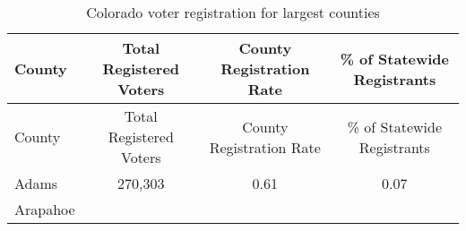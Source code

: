 \documentclass[12pt,twoside]{reedthesis}
\begin{document}
  \begin{longtable}[]{@{}lccc@{}}
  \caption{Colorado voter registration for largest counties
  \label{tab:voter_reg}}\tabularnewline
  \toprule
  \begin{minipage}[b]{0.10\columnwidth}\raggedright\strut
  County\strut
  \end{minipage} & \begin{minipage}[b]{0.24\columnwidth}\centering\strut
  Total Registered Voters\strut
  \end{minipage} & \begin{minipage}[b]{0.29\columnwidth}\centering\strut
  County Registration Rate\strut
  \end{minipage} & \begin{minipage}[b]{0.25\columnwidth}\centering\strut
  \% of Statewide Registrants\strut
  \end{minipage}\tabularnewline
  \midrule
  \endfirsthead
  \toprule
  \begin{minipage}[b]{0.10\columnwidth}\raggedright\strut
  County\strut
  \end{minipage} & \begin{minipage}[b]{0.24\columnwidth}\centering\strut
  Total Registered Voters\strut
  \end{minipage} & \begin{minipage}[b]{0.29\columnwidth}\centering\strut
  County Registration Rate\strut
  \end{minipage} & \begin{minipage}[b]{0.25\columnwidth}\centering\strut
  \% of Statewide Registrants\strut
  \end{minipage}\tabularnewline
  \midrule
  \endhead
  \begin{minipage}[t]{0.10\columnwidth}\raggedright\strut
  Adams\strut
  \end{minipage} & \begin{minipage}[t]{0.24\columnwidth}\centering\strut
  270,303\strut
  \end{minipage} & \begin{minipage}[t]{0.29\columnwidth}\centering\strut
  0.61\strut
  \end{minipage} & \begin{minipage}[t]{0.25\columnwidth}\centering\strut
  0.07\strut
  \end{minipage}\tabularnewline
  \begin{minipage}[t]{0.10\columnwidth}\raggedright\strut
  Arapahoe\strut
  \end{minipage} & \begin{minipage}[t]{0.24\columnwidth}\centering\strut

\end{minipage}
\end{longtable}
\end{document}
